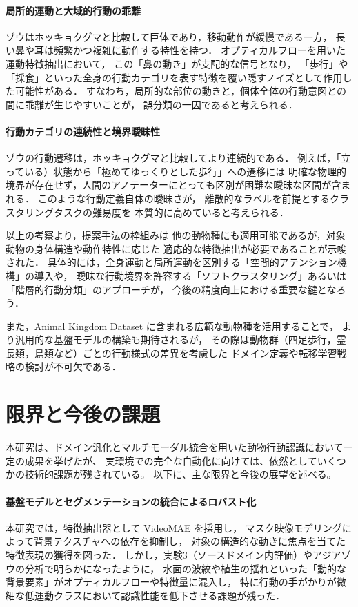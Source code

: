 \paragraph{局所的運動と大域的行動の乖離}
ゾウはホッキョクグマと比較して巨体であり，移動動作が緩慢である一方，
長い鼻や耳は頻繁かつ複雑に動作する特性を持つ．
オプティカルフローを用いた運動特徴抽出において，
この「鼻の動き」が支配的な信号となり，
「歩行」や「採食」といった全身の行動カテゴリを表す特徴を覆い隠すノイズとして作用した可能性がある．
すなわち，局所的な部位の動きと，個体全体の行動意図との間に乖離が生じやすいことが，
誤分類の一因であると考えられる．

\paragraph{行動カテゴリの連続性と境界曖昧性}
ゾウの行動遷移は，ホッキョクグマと比較してより連続的である．
例えば，「立っている）状態から「極めてゆっくりとした歩行」への遷移には
明確な物理的境界が存在せず，人間のアノテーターにとっても区別が困難な曖昧な区間が含まれる．
このような行動定義自体の曖昧さが，
離散的なラベルを前提とするクラスタリングタスクの難易度を
本質的に高めていると考えられる．

以上の考察より，提案手法の枠組みは
他の動物種にも適用可能であるが，対象動物の身体構造や動作特性に応じた
適応的な特徴抽出が必要であることが示唆された．
具体的には，全身運動と局所運動を区別する「空間的アテンション機構」の導入や，
曖昧な行動境界を許容する「ソフトクラスタリング」あるいは「階層的行動分類」のアプローチが，
今後の精度向上における重要な鍵となろう．

また，Animal Kingdom Dataset \cite{ng2022animal} に含まれる広範な動物種を活用することで，
より汎用的な基盤モデルの構築も期待されるが，
その際は動物群（四足歩行，霊長類，鳥類など）ごとの行動様式の差異を考慮した
ドメイン定義や転移学習戦略の検討が不可欠である．

\section{限界と今後の課題} 本研究は、ドメイン汎化とマルチモーダル統合を用いた動物行動認識において一定の成果を挙げたが、 実環境での完全な自動化に向けては、依然としていくつかの技術的課題が残されている。 以下に、主な限界と今後の展望を述べる。

\paragraph{基盤モデルとセグメンテーションの統合によるロバスト化}
本研究では，特徴抽出器として VideoMAE を採用し，
マスク映像モデリングによって背景テクスチャへの依存を抑制し，
対象の構造的な動きに焦点を当てた特徴表現の獲得を図った．
しかし，実験3（ソースドメイン内評価）やアジアゾウの分析で明らかになったように，
水面の波紋や植生の揺れといった「動的な背景要素」がオプティカルフローや特徴量に混入し，
特に行動の手がかりが微細な低運動クラスにおいて認識性能を低下させる課題が残った．

